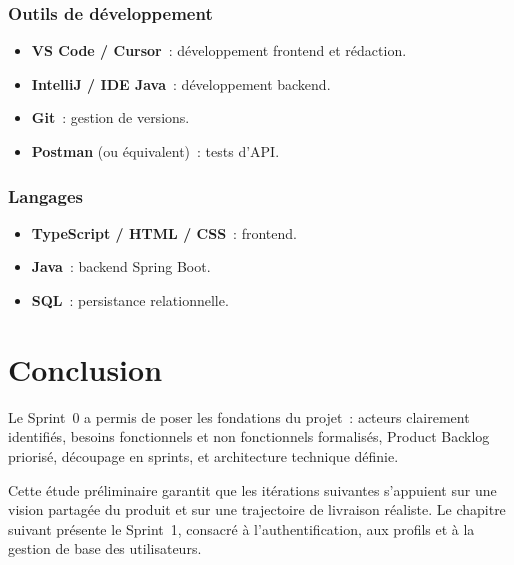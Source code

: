 \subsubsection{Outils de développement}

\begin{itemize}
  \item \textbf{VS Code / Cursor}~: développement frontend et rédaction.
  \item \textbf{IntelliJ / IDE Java}~: développement backend.
  \item \textbf{Git}~: gestion de versions.
  \item \textbf{Postman} (ou équivalent)~: tests d'API.
\end{itemize}


\subsubsection{Langages}

\begin{itemize}
  \item \textbf{TypeScript / HTML / CSS}~: frontend.
  \item \textbf{Java}~: backend Spring Boot.
  \item \textbf{SQL}~: persistance relationnelle.
\end{itemize}


\section{Conclusion}

Le Sprint~0 a permis de poser les fondations du projet~: acteurs clairement
identifiés, besoins fonctionnels et non fonctionnels formalisés, Product Backlog
priorisé, découpage en sprints, et architecture technique définie.

Cette étude préliminaire garantit que les itérations suivantes s'appuient sur
une vision partagée du produit et sur une trajectoire de livraison réaliste.
Le chapitre suivant présente le Sprint~1, consacré à l'authentification, aux
profils et à la gestion de base des utilisateurs.

\clearpage
